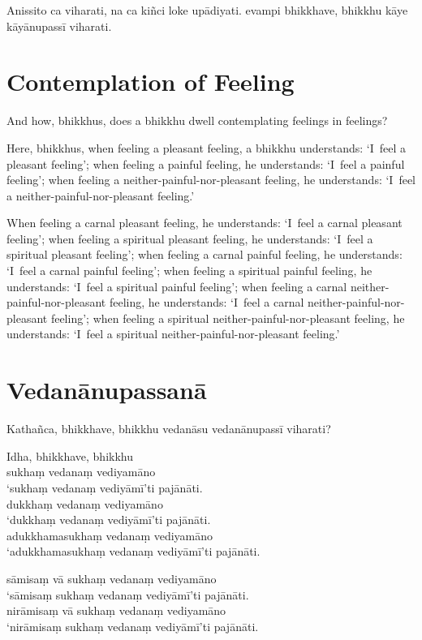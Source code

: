 Anissito ca viharati, na ca kiñci loke upādiyati. evampi bhikkhave, bhikkhu kāye
kāyānupassī viharati.



\englishPage
\chapter{Contemplation of Feeling}

And how, bhikkhus, does a bhikkhu dwell contemplating feelings in feelings?

Here, bhikkhus, when feeling a pleasant feeling, a bhikkhu understands:
`I~feel a pleasant feeling';
when feeling a painful feeling, he understands:
`I~feel a painful feeling';
when feeling a neither-painful-nor-pleasant feeling, he understands:
`I~feel a neither-painful-nor-pleasant feeling.'

When feeling a carnal pleasant feeling, he understands:
`I~feel a carnal pleasant feeling';
when feeling a spiritual pleasant feeling, he understands:
`I~feel a spiritual pleasant feeling';
when feeling a carnal painful feeling, he understands:
`I~feel a carnal painful feeling';
when feeling a spiritual painful feeling, he understands:
`I~feel a spiritual painful feeling';
when feeling a carnal neither-painful-nor-pleasant feeling, he understands:
`I~feel a carnal neither-painful-nor-pleasant feeling';
when feeling a spiritual neither-painful-nor-pleasant feeling, he understands:
`I~feel a spiritual neither-painful-nor-pleasant feeling.'

\paliPage
\chapter*{Vedanānupassanā}

Kathañca, bhikkhave, bhikkhu vedanāsu vedanānupassī viharati?

Idha, bhikkhave, bhikkhu\\
sukhaṃ vedanaṃ vediyamāno\\
‘sukhaṃ vedanaṃ vediyāmī’ti pajānāti.\\
dukkhaṃ vedanaṃ vediyamāno\\
‘dukkhaṃ vedanaṃ vediyāmī’ti pajānāti.\\
adukkhamasukhaṃ vedanaṃ vediyamāno\\
‘adukkhamasukhaṃ vedanaṃ vediyāmī’ti pajānāti.

sāmisaṃ vā sukhaṃ vedanaṃ vediyamāno\\
‘sāmisaṃ sukhaṃ vedanaṃ vediyāmī’ti pajānāti.\\
nirāmisaṃ vā sukhaṃ vedanaṃ vediyamāno\\
‘nirāmisaṃ sukhaṃ vedanaṃ vediyāmī’ti pajānāti.


